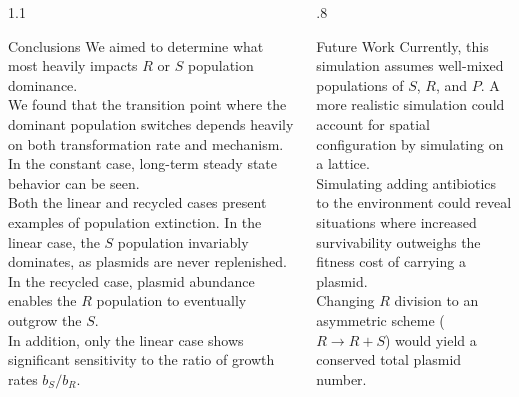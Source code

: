 \documentclass[final]{beamer}
\newlength{\sepwid}
\newlength{\onecolwid}
\begin{document}
\begin{frame}[t]
\begin{block}
\begin{columns}[t]
\begin{column}{1.1\onecolwid}
  \begin{alertblock}{Conclusions}
    We aimed to determine what most heavily impacts $R$ or $S$ population dominance. \\
    \quad\quad We found that the transition point where the dominant population switches
    depends heavily on both transformation rate and mechanism. In the constant case,
    long-term steady state behavior can be seen.\\
    \quad\quad Both the linear and recycled cases present examples of population
    extinction. In the linear case, the $S$ population invariably dominates,
    as plasmids are never replenished. In the recycled case, plasmid
    abundance enables the $R$ population to eventually outgrow the $S$.\\
    \quad\quad In addition, only the linear case shows significant sensitivity
    to the ratio of growth rates $b_S/b_R$.

  \end{alertblock}
\end{column}


\begin{column}{.8\onecolwid}
  \begin{alertblock}{Future Work}
    Currently, this simulation assumes well-mixed populations of $S$, $R$, and $P$.
    A more realistic simulation could account for spatial configuration by simulating on a lattice.\\
    \quad\quad Simulating adding antibiotics to the environment could reveal situations
    where increased survivability outweighs the fitness cost of carrying a plasmid. \\
    \quad Changing $R$ division to an asymmetric scheme ($R \rightarrow R + S$) would
    yield a conserved total plasmid number.
    \vspace{.5ex}


\end{alertblock}
\end{column}
\end{columns}
\end{block}
\end{frame}
\end{document}
